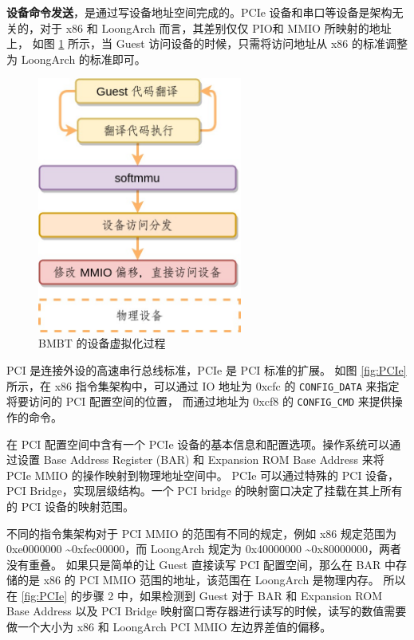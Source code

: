 \textbf{设备命令发送}，是通过写设备地址空间完成的。PCIe 设备和串口等设备是架构无关的，对于 x86 和 LoongArch 而言，其差别仅仅 PIO和 MMIO 所映射的地址上，
如图 \ref{fig:bmbt_device} 所示，当 Guest 访问设备的时候，只需将访问地址从 x86 的标准调整为 LoongArch 的标准即可。
\begin{figure}[!htbp]
	\centering
	\includegraphics[width=0.6\textwidth]{./images/bmbt-device.jpg}
	\caption{BMBT 的设备虚拟化过程}
	\label{fig:bmbt_device}
\end{figure}

PCI \citep{pci2002express} 是连接外设的高速串行总线标准，PCIe 是 PCI 标准的扩展。
如图 \ref{fig:PCIe} 所示，在 x86 指令集架构中，可以通过 IO 地址为 0xcfc 的 \verb|CONFIG_DATA| 来指定将要访问的 PCI 配置空间的位置，
而通过地址为 0xcf8 的 \verb|CONFIG_CMD| 来提供操作的命令。

在 PCI 配置空间中含有一个 PCIe 设备的基本信息和配置选项。操作系统可以通过设置 Base Address Register (BAR) 和 Expansion ROM Base Address 来将 PCIe MMIO 的操作映射到物理地址空间中。
PCIe 可以通过特殊的 PCI 设备，PCI Bridge，实现层级结构。一个 PCI bridge 的映射窗口决定了挂载在其上所有的 PCI 设备的映射范围。

不同的指令集架构对于 PCI MMIO  的范围有不同的规定，例如 x86 规定范围为 0xe0000000 \textasciitilde 0xfec00000，而 LoongArch 规定为 0x40000000 \textasciitilde 0x80000000，两者没有重叠。
如果只是简单的让 Guest 直接读写 PCI 配置空间，那么在 BAR 中存储的是 x86 的 PCI MMIO 范围的地址，该范围在 LoongArch 是物理内存。
所以在 \ref{fig:PCIe} 的步骤 2 中，如果检测到 Guest 对于 BAR 和 Expansion ROM Base Address 以及 PCI Bridge 映射窗口寄存器进行读写的时候，读写的数值需要做一个大小为 x86 和 LoongArch PCI MMIO 左边界差值的偏移。

